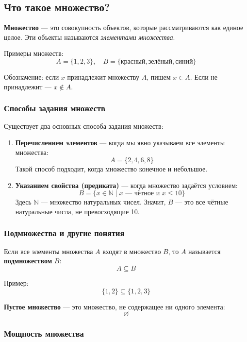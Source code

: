 \subsection{Что такое множество?}

\textbf{Множество} — это совокупность объектов, которые рассматриваются как единое целое. Эти объекты называются \textit{элементами множества}.

Примеры множеств:
\[
A = \{1, 2, 3\}, \quad B = \{\text{красный}, \text{зелёный}, \text{синий}\}
\]

Обозначение: если $x$ принадлежит множеству $A$, пишем $x \in A$. Если не принадлежит — $x \notin A$.

\subsubsection{Способы задания множеств}

Существует два основных способа задания множеств:

\begin{enumerate}[label=\arabic*)]
  \item \textbf{Перечислением элементов} — когда мы явно указываем все элементы множества:
  \[
  A = \{2, 4, 6, 8\}
  \]
  Такой способ подходит, когда множество конечное и небольшое.

  \item \textbf{Указанием свойства (предиката)} — когда множество задаётся условием:
  \[
  B = \{x \in \mathbb{N} \mid x \text{ — чётное и } x \leq 10\}
  \]
  Здесь $\mathbb{N}$ — множество натуральных чисел. Значит, $B$ — это все чётные натуральные числа, не превосходящие 10.
\end{enumerate}

\subsubsection{Подмножества и другие понятия}

Если все элементы множества $A$ входят в множество $B$, то $A$ называется \textbf{подмножеством} $B$:
\[
A \subseteq B
\]

Пример:
\[
\{1, 2\} \subseteq \{1, 2, 3\}
\]

\textbf{Пустое множество} — это множество, не содержащее ни одного элемента:
\[
\varnothing
\]

\subsubsection{Мощность множества}

